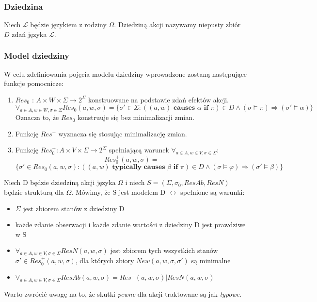 \documentclass{article}
\begin{document}
\subsubsection{Dziedzina}
Niech $\mathcal{L}$ będzie językiem z rodziny $\Omega$. Dziedziną akcji nazywamy niepusty zbiór $D$ zdań języka $\mathcal{L}$.

\subsubsection{Model dziedziny}
W celu zdefiniowania pojęcia modelu dziedziny wprowadzone zostaną następujące funkcje pomocnicze:
\begin{enumerate}
	\item $Res_{0}$ : $A \times W \times \Sigma \to 2^{\Sigma}$ konstruowane na podstawie zdań efektów akcji.
	\[ \forall_{a \in A, w \in W, \sigma \in \Sigma} Res_{0}(a,w,\sigma) = \{\sigma' \in \Sigma: ((a, w) \textbf{ causes } \alpha \textbf{ if } \pi) \in D \land (\sigma \models \pi) \Rightarrow (\sigma' \models \alpha) \}  \]
	Oznacza to, że $Res_{0}$ konstruuje się bez minimalizacji zmian.
	\item Funkcję $Res^{-}$ wyznacza się stosując minimalizację zmian.
	\item Funkcję $Res_{0}^{+} : A \times V \times \Sigma \to 2^{\Sigma}$ spełniającą warunek $\forall_{a \in A, w \in V, \sigma \in \Sigma}$:
	\[ Res_{0}^{+}(a, w,\sigma) = \]
	\[ \{\sigma' \in Res_{0}(a, w,\sigma) : ((a, w) \textbf{ typically causes } \beta \textbf{ if } \pi) \in D \land (\sigma \models \varphi) \Rightarrow (\sigma' \models \beta) \}  \]
\end{enumerate}

Niech D będzie dziedziną akcji języka $\Omega$ i niech $S=(\Sigma, \sigma_{0}, ResAb, ResN)$ będzie strukturą dla $\Omega$. Mówimy, że S jest modelem D $\leftrightarrow$ spełnione są warunki:
\begin{itemize}
	\item $\Sigma$ jest zbiorem stanów z dziedziny D
	\item każde zdanie obserwacji i każde zdanie wartości z dziedziny D jest prawdziwe w S
	\item $\forall_{ a \in A, w \in V, \sigma \in \Sigma } ResN(a, w, \sigma)$ jest zbiorem tych wszystkich stanów $\sigma' \in Res_{0}^{+}(a, w, \sigma)$, dla których zbiory $New(a, w, \sigma, \sigma')$ są minimalne
	\item $\forall_{a \in A, w \in V, \sigma \in \Sigma} ResAb(a, w, \sigma) = Res^{-}(a, w, \sigma) | ResN(a, w, \sigma)$
\end{itemize}
Warto zwrócić uwagę na to, że skutki \textit{pewne} dla akcji traktowane są jak \textit{typowe}.
\end{document}
